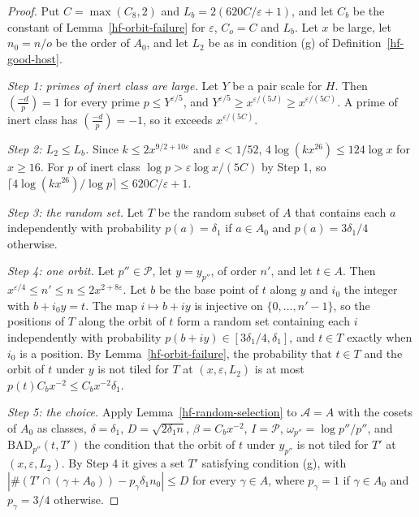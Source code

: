 \begin{proof}
Put $C=\max(C_8,2)$ and $L_b=2(620C/\varepsilon+1)$, and let $C_b$ be the constant of
Lemma~\ref{hf-orbit-failure} for $\varepsilon$, $C_o=C$ and $L_b$. Let $x$ be large, let $n_0=n/o$
be the order of $A_0$, and let $L_2$ be as in condition (g) of Definition~\ref{hf-good-host}.

\emph{Step 1: primes of inert class are large.} Let $Y$ be a pair scale for $H$. Then
$\left(\frac{-d}{p}\right)=1$ for every prime $p\leq Y^{\varepsilon/5}$, and
$Y^{\varepsilon/5}\geq x^{\varepsilon/(5J)}\geq x^{\varepsilon/(5C)}$. A prime of inert class has
$\left(\frac{-d}{p}\right)=-1$, so it exceeds $x^{\varepsilon/(5C)}$.

\emph{Step 2: $L_2\leq L_b$.} Since $k\leq2x^{9/2+10\varepsilon}$ and $\varepsilon<1/52$,
$4\log(kx^{26})\leq124\log x$ for $x\geq16$. For $p$ of inert class $\log p>\varepsilon\log x/(5C)$
by Step 1, so $\lceil4\log(kx^{26})/\log p\rceil\leq620C/\varepsilon+1$.

\emph{Step 3: the random set.} Let $T$ be the random subset of $A$ that contains each $a$
independently with probability $p(a)=\delta_1$ if $a\in A_0$ and $p(a)=3\delta_1/4$ otherwise.

\emph{Step 4: one orbit.} Let $p''\in\mathcal P$, let $y=y_{p''}$, of order $n'$, and let $t\in A$.
Then $x^{\varepsilon/4}\leq n'\leq n\leq2x^{2+8\varepsilon}$. Let $b$ be the base point of $t$ along
$y$ and $i_0$ the integer with $b+i_0y=t$. The map $i\mapsto b+iy$ is injective on
$\{0,\ldots,n'-1\}$, so the positions of $T$ along the orbit of $t$ form a random set containing
each $i$ independently with probability $p(b+iy)\in[3\delta_1/4,\delta_1]$, and $t\in T$ exactly
when $i_0$ is a position. By Lemma~\ref{hf-orbit-failure}, the probability that $t\in T$ and the
orbit of $t$ under $y$ is not tiled for $T$ at $(x,\varepsilon,L_2)$ is at most
$p(t)C_bx^{-2}\leq C_bx^{-2}\delta_1$.

\emph{Step 5: the choice.} Apply Lemma~\ref{hf-random-selection} to $\mathcal A=A$ with the cosets
of $A_0$ as classes, $\delta=\delta_1$, $D=\sqrt{2\delta_1n}$, $\beta=C_bx^{-2}$, $I=\mathcal P$,
$\omega_{p''}=\log p''/p''$, and $\mathrm{BAD}_{p''}(t,T')$ the condition that the orbit of $t$ under
$y_{p''}$ is not tiled for $T'$ at $(x,\varepsilon,L_2)$. By Step 4 it gives a set $T'$ satisfying
condition (g), with $|\#(T'\cap(\gamma+A_0))-p_\gamma\delta_1n_0|\leq D$ for every $\gamma\in A$,
where $p_\gamma=1$ if $\gamma\in A_0$ and $p_\gamma=3/4$ otherwise.


\end{proof}
